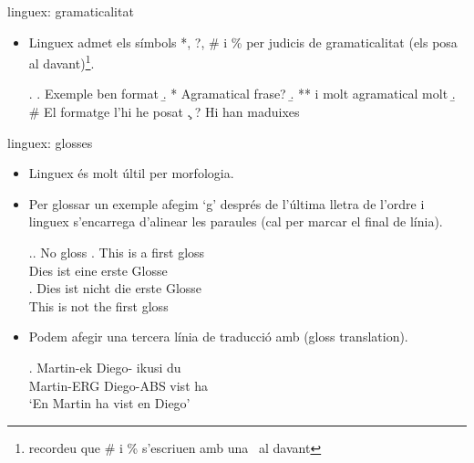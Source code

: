 \begin{frame}[fragile]{linguex: gramaticalitat}
\begin{itemize}
    \item Linguex admet els símbols *, ?, \# i \% per judicis de gramaticalitat (els posa al davant)\footnote{recordeu que \# i \% s'escriuen amb una \bs~al davant}.
\begin{exampletwouptiny2}
\ex. 
\a. Exemple ben format 
\b. * Agramatical frase? 
\b. ** i molt agramatical molt
\b. \# El formatge l'hi he posat 
\c. ? Hi han maduixes 

\end{exampletwouptiny2}
\end{itemize}

\end{frame}

\begin{frame}[fragile]{linguex: glosses}
\begin{itemize}
\item Linguex és molt últil per morfologia. 
\item Per glossar un exemple afegim `g' després de l'última lletra de l'ordre i linguex s'encarrega d'alinear les paraules (cal \keystrokebftt{\bs\bs}  per marcar el final de línia).
\begin{exampletwouptiny2}
\ex.\a. No gloss
\bg. This is a first gloss\\
Dies ist eine erste Glosse\\

\exg.
Dies ist nicht die erste Glosse\\
This is not the first gloss\\

\end{exampletwouptiny2}
\item Podem afegir una tercera línia de traducció amb  (gloss translation).
\begin{exampletwouptiny2}
\exg. 
Martin-ek Diego-\zero{} ikusi du \\
Martin-ERG Diego-ABS vist ha \\
\glt `En Martin ha vist en Diego'

\end{exampletwouptiny2}
\end{itemize}

\end{frame}

